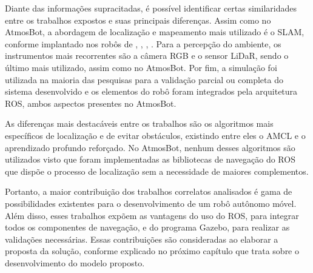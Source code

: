 Diante das informações supracitadas, é possível identificar certas similaridades entre os trabalhos expostos e suas principais diferenças. Assim como no AtmosBot, a abordagem de localização e mapeamento mais utilizado é o SLAM, conforme implantado nos robôs de \citet{justina:2019}, \citet{navegacaoSlam:2022}, \citet{dpoom}, \citet{lidarRGBD}. Para a percepção do ambiente,  os instrumentos mais recorrentes são a câmera RGB e o sensor LiDaR, sendo o último mais utilizado, assim como no AtmosBot. Por fim, a simulação foi utilizada na maioria das pesquisas para a validação parcial ou completa do sistema desenvolvido e os elementos do robô foram integrados pela arquitetura ROS, ambos aspectos presentes no AtmosBot.

As diferenças mais destacáveis entre os trabalhos são os algoritmos mais específicos de localização e de evitar obstáculos, existindo entre eles o AMCL e o aprendizado profundo reforçado. No AtmosBot, nenhum desses algoritmos são utilizados visto que foram implementadas as bibliotecas de navegação do ROS que dispõe o processo de localização sem a necessidade de maiores complementos.

Portanto, a maior contribuição dos trabalhos correlatos analisados é gama de possibilidades existentes para o desenvolvimento de um robô autônomo móvel. Além disso, esses trabalhos expõem as vantagens do uso do ROS, para integrar todos os componentes de navegação, e do programa Gazebo, para realizar as validações necessárias. Essas contribuições são consideradas ao elaborar a proposta da solução, conforme explicado no próximo capítulo que trata sobre o desenvolvimento do modelo proposto.